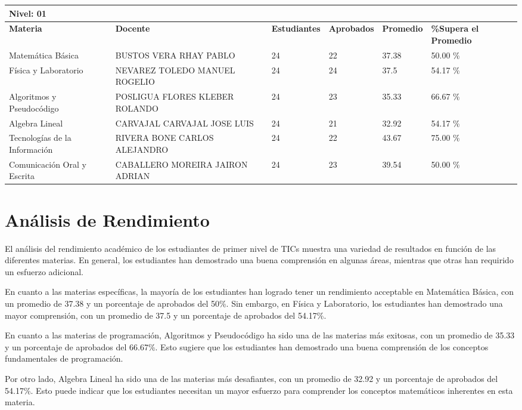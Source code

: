\small
\begin{tabularx}{\textwidth}{|p{2.5cm}|p{2.5cm}|X|X|X|X|}
\hline
\multicolumn{6}{|X|}{\textbf{Nivel: 01 }}\\\hline\textbf{Materia} & \textbf{Docente} & \textbf{Estudiantes} & \textbf{Aprobados} & \textbf{Promedio} & \textbf{\%Supera el Promedio} \\ \hline
Matemática Básica & BUSTOS VERA RHAY PABLO & 24 & 22 & 37.38 & 50.00 \%\\ \hline
Física y Laboratorio & NEVAREZ TOLEDO MANUEL ROGELIO & 24 & 24 & 37.5 & 54.17 \%\\ \hline
Algoritmos y Pseudocódigo & POSLIGUA FLORES KLEBER ROLANDO & 24 & 23 & 35.33 & 66.67 \%\\ \hline
Algebra Lineal & CARVAJAL CARVAJAL JOSE LUIS & 24 & 21 & 32.92 & 54.17 \%\\ \hline
Tecnologías de la Información  & RIVERA BONE CARLOS ALEJANDRO & 24 & 22 & 43.67 & 75.00 \%\\ \hline
Comunicación Oral y Escrita & CABALLERO MOREIRA JAIRON ADRIAN & 24 & 23 & 39.54 & 50.00 \%\\ \hline
\end{tabularx}

\vspace{1cm}
\section{Análisis de Rendimiento}
El análisis del rendimiento académico de los estudiantes de primer nivel de TICs muestra una variedad de resultados en función de las diferentes materias. En general, los estudiantes han demostrado una buena comprensión en algunas áreas, mientras que otras han requirido un esfuerzo adicional.

En cuanto a las materias específicas, la mayoría de los estudiantes han logrado tener un rendimiento acceptable en Matemática Básica, con un promedio de 37.38 y un porcentaje de aprobados del 50\%. Sin embargo, en Física y Laboratorio, los estudiantes han demostrado una mayor comprensión, con un promedio de 37.5 y un porcentaje de aprobados del 54.17\%.

En cuanto a las materias de programación, Algoritmos y Pseudocódigo ha sido una de las materias más exitosas, con un promedio de 35.33 y un porcentaje de aprobados del 66.67\%. Esto sugiere que los estudiantes han demostrado una buena comprensión de los conceptos fundamentales de programación.

Por otro lado, Algebra Lineal ha sido una de las materias más desafiantes, con un promedio de 32.92 y un porcentaje de aprobados del 54.17\%. Esto puede indicar que los estudiantes necesitan un mayor esfuerzo para comprender los conceptos matemáticos inherentes en esta materia.

